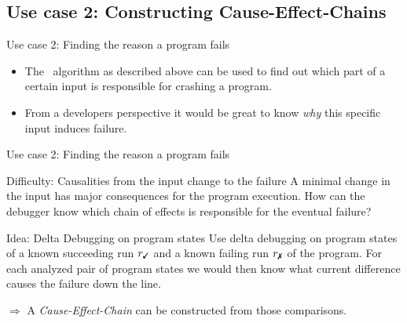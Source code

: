 \subsection{Use case 2: Constructing Cause-Effect-Chains}
\begin{frame}{Use case 2: Finding the reason a program fails}
	\begin{itemize}
		\item The \ddp\ algorithm as described above can be used to find out which part of a certain input is responsible for crashing a program.
		\item From a developers perspective it would be great to know \textit{why} this specific input induces failure.
	\end{itemize}


\end{frame}

\begin{frame}{Use case 2: Finding the reason a program fails}
	\begin{alertblock}{Difficulty: Causalities from the input change to the failure}
		A minimal change in the input has major consequences for the program execution. How can the debugger know which chain of effects is responsible for the eventual failure?
	\end{alertblock}

	\bigskip
	\pause

	\begin{exampleblock}{Idea: Delta Debugging on program states}
		Use delta debugging on program states of a known succeeding run $r_\cmark$ and a known failing run $r_\xmark$ of the program. For each analyzed pair of program states we would then know what current difference causes the failure down the line.

		\bigskip

		$\Rightarrow$ A \textit{Cause-Effect-Chain} can be constructed from those comparisons.
	\end{exampleblock}	
\end{frame}

